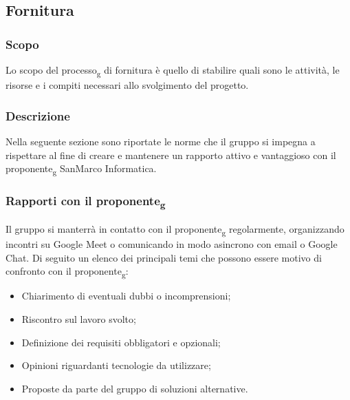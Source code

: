 \subsection{Fornitura}

\subsubsection{Scopo}
Lo scopo del processo\textsubscript{g} di fornitura è quello di stabilire quali sono le attività, 
le risorse e i compiti necessari allo svolgimento del progetto. 

\subsubsection{Descrizione}
Nella seguente sezione sono riportate le norme che il gruppo si impegna a rispettare al fine di creare e 
mantenere un rapporto attivo e vantaggioso con il proponente\textsubscript{g} SanMarco Informatica. 

\subsubsection{Rapporti con il proponente\textsubscript{g}}
Il gruppo si manterrà in contatto con il proponente\textsubscript{g} regolarmente, organizzando incontri su Google Meet o 
comunicando in modo asincrono con email o Google Chat. Di seguito un elenco dei principali temi che possono essere 
motivo di confronto con il proponente\textsubscript{g}: 
\begin{itemize} 
	\item Chiarimento di eventuali dubbi o incomprensioni; 
	\item Riscontro sul lavoro svolto;
	\item Definizione dei requisiti obbligatori e opzionali;
	\item Opinioni riguardanti tecnologie da utilizzare;
	\item Proposte da parte del gruppo di soluzioni alternative.
\end{itemize}


